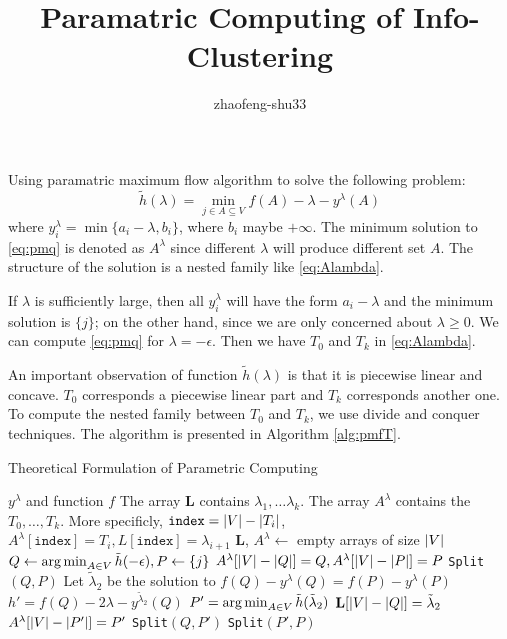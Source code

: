 \documentclass{article}
\title{Paramatric Computing of Info-Clustering}
\author{zhaofeng-shu33}
\begin{document}
\maketitle
Using paramatric maximum flow algorithm to solve the following problem:
\begin{equation}\label{eq:pmq}
\tilde{h}(\lambda) = \min_{j \in A \subseteq V} f(A) - \lambda - y^{\lambda}(A)
\end{equation}
where
$y^{\lambda}_i = \min\{a_i - \lambda, b_i\}$, where $b_i$ maybe $+\infty$.
The minimum solution to \eqref{eq:pmq} is denoted as $A^{\lambda}$ since different $\lambda$ will produce different set $A$. The structure of the solution is a nested family like \eqref{eq:Alambda}.

If $\lambda$ is sufficiently large, then all $y_i^{\lambda}$ will have the form $a_i - \lambda$ and the minimum solution is $\{j\}$; on the other hand, since we are only concerned about $\lambda \geq 0$. We can compute \eqref{eq:pmq} for $\lambda = -\epsilon$. Then we have $T_0$ and $T_k$ in \eqref{eq:Alambda}.

An important observation of function $\tilde{h}(\lambda)$ is that it is piecewise linear and concave. $T_0$ corresponds a piecewise linear part and $T_k$ corresponds another one.  To compute the nested family between $T_0$ and $T_k$, we use divide and conquer techniques. The algorithm is presented in Algorithm \ref{alg:pmfT}.

\begin{algorithm}
\caption{Theoretical Formulation of Parametric Computing}\label{alg:pmfT}
\begin{algorithmic}[1]
\REQUIRE $y^{\lambda}$ and function $f$
\ENSURE The array \textbf{L} contains $\lambda_1, \dots \lambda_k$. The array $A^{\lambda}$ contains the $T_0,\dots, T_k$. More specificly, $\mathtt{index} = \lvert V\rvert - \lvert T_i\rvert$, $A^{\lambda}[\mathtt{index}]=T_i,  L[\mathtt{index}]=\lambda_{i+1}$\footnotemark
\STATE \textbf{L}, $A^{\lambda} \leftarrow$ empty arrays of size $\lvert V\rvert$
\STATE $Q \leftarrow \operatorname*{arg\,min}_{A\in V} \tilde{h}(-\epsilon), P \leftarrow \{ j \}$
\STATE $A^{\lambda}[ \lvert V\rvert-\lvert Q\rvert]=Q, A^{\lambda}[ \lvert V\rvert-\lvert P\rvert] = P$
\STATE \texttt{Split}$(Q,P)$
\STATE Let $\tilde{\lambda}_2$ be the solution to $f(Q) - y^{\lambda}(Q) = f(P) - y^{\lambda}(P)$
\STATE $h' = f(Q) - 2\lambda - y^{\tilde{\lambda}_2}(Q)$
 \STATE $P' =\operatorname*{arg\,min}_{A\in V} \tilde{h}(\tilde{\lambda}_2) $ 
 	\STATE $\mathbf{L}[\lvert V\rvert - \lvert Q\rvert] = \tilde{\lambda}_2$
 \ELSE
 	\STATE $A^{\lambda}[\lvert V\rvert - \lvert P'\rvert]=P'$
 	\STATE \texttt{Split}$(Q,P')$
 	\STATE \texttt{Split}$(P',P)$
 \ENDIF
\ENDFUNCTION
\end{algorithmic}
\end{algorithm}
\end{document}
